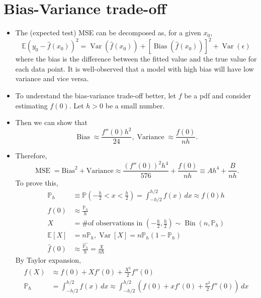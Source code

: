 \documentclass[11pt]{article}
\newcommand{\opn}{\operatorname}
\begin{document}
\section{Bias-Variance trade-off}
\begin{itemize}
  \item The (expected test) MSE can be decomposed as, for a given $x_{0}$,
  $$
    \mathbb{E}\left(y_{0}-\hat{f}\left(x_{0}\right)\right)^{2} = \opn{Var}\left(\hat{f}\left(x_{0}\right)\right) + \left[\opn{Bias}\left(\hat{f}\left(x_{0}\right)\right) \right]^{2} + \opn{Var}\left(\epsilon\right)
  $$
  where the bias is the difference between the fitted value and the true value for each data point. It is well-observed that a model with high bias will have low variance and vice versa.
  \item To understand the bias-variance trade-off better, let $f$ be a pdf and consider estimating $f(0)$. Let $h>0$ be a small number.
  \item Then we can show that
  $$
    \opn{Bias}\approx \frac{f''\left(0\right)h^{2}}{24}, \opn{Variance}\approx \frac{f\left(0\right)}{nh}.
  $$
  \item Therefore,
  $$
    \opn{MSE} = \text{Bias}^{2} + \text{Variance} \approx \frac{\left(f''\left(0\right)\right)^{2}h^{4}}{576} + \frac{f\left(0\right)}{nh} \equiv Ah^{4} + \frac{B}{nh}.
  $$
  To prove this,
  \begin{align*}
    \mathbb{P}_{h}&\equiv \mathbb{P}\left(-\frac{h}{2} < x < \frac{h}{2}\right) = \int_{-h/2}^{h/2} f\left(x\right)\, dx \approx f\left(0\right)h\\
    f\left(0\right) &\approx \frac{\mathbb{P}_{h}}{h}\\
    X &= \text{\# of observations in }\left(-\frac{h}{2}, \frac{h}{2}\right) \sim \opn{Bin}\left(n, \mathbb{P}_{h}\right)\\
    \mathbb{E}\left[X\right] &= n\mathbb{P}_{h}, \opn{Var}\left[X\right] = n\mathbb{P}_{h}\left(1-\mathbb{P}_{h}\right)\\
    \hat{f}\left(0\right) &\approx \frac{\widehat{\mathbb{P}_{h}}}{h} = \frac{X}{nh}
  \end{align*}
  By Taylor expansion,
  \begin{align*}
    f\left(X\right) &\approx f\left(0\right) + Xf'\left(0\right) + \frac{X^{2}}{2}f''\left(0\right)\\
    \mathbb{P}_{h} &= \int_{-h/2}^{h/2}f\left(x\right) \, dx \approx \int_{-h/2}^{h/2} \left(f\left(0\right)+xf'\left(0\right)+\frac{x^{2}}{2}f''\left(0\right)\right)\,dx\\

\end{align*}
\end{itemize}
\end{document}
